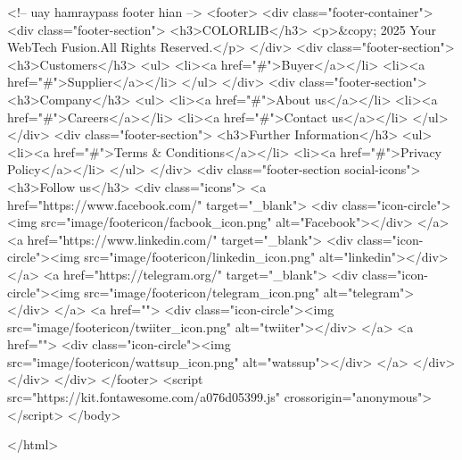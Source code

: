    
        <!-- uay hamraypass footer hian  -->
        <footer>
            <div class="footer-container">
                <div class="footer-section">
                    <h3>COLORLIB</h3>
                    <p>&copy; 2025 Your WebTech Fusion.All Rights Reserved.</p>
                </div>
                <div class="footer-section">
                    <h3>Customers</h3>
                    <ul>
                        <li><a href="#">Buyer</a></li>
                        <li><a href="#">Supplier</a></li>
                    </ul>
                </div>
                <div class="footer-section">
                    <h3>Company</h3>
                    <ul>
                        <li><a href="#">About us</a></li>
                        <li><a href="#">Careers</a></li>
                        <li><a href="#">Contact us</a></li>
                    </ul>
                </div>
                <div class="footer-section">
                    <h3>Further Information</h3>
                    <ul>
                        <li><a href="#">Terms & Conditions</a></li>
                        <li><a href="#">Privacy Policy</a></li>
                    </ul>
                </div>
                <div class="footer-section social-icons">
                    <h3>Follow us</h3>
                    <div class="icons">
                        <a href="https://www.facebook.com/" target="_blank">
                            <div class="icon-circle"><img src="image/footericon/facbook_icon.png" alt="Facebook"></div>
                        </a>
                        <a href="https://www.linkedin.com/" target="_blank">
                            <div class="icon-circle"><img src="image/footericon/linkedin_icon.png" alt="linkedin"></div>
                        </a>
                        <a href="https://telegram.org/" target="_blank">
                            <div class="icon-circle"><img src="image/footericon/telegram_icon.png" alt="telegram"></div>
                        </a>
                        <a href="">
                            <div class="icon-circle"><img src="image/footericon/twiiter_icon.png" alt="twiiter"></div>
                        </a>
                        <a href="">
                            <div class="icon-circle"><img src="image/footericon/wattsup_icon.png" alt="watssup"></div>
                        </a>
                    </div>
                </div>
            </div>
        </footer>
        <script src="https://kit.fontawesome.com/a076d05399.js" crossorigin="anonymous"></script>
</body>

</html>